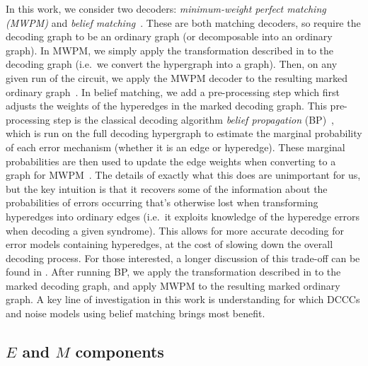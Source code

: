 In this work, we consider two decoders: \textit{minimum-weight perfect matching (MWPM)} and \textit{belief matching}~\cite{higgott2022fragile}.
These are both matching decoders, so require the decoding graph to be an ordinary graph (or decomposable into an ordinary graph).
In MWPM, we simply apply the transformation described in  to the decoding graph (i.e.~we convert the hypergraph into a graph).
Then, on any given run of the circuit, we apply the MWPM decoder to the resulting marked ordinary graph~\cite{higgott2025sparse}.
In belief matching, we add a pre-processing step which first adjusts the weights of the hyperedges in the marked decoding graph.
This pre-processing step is the classical decoding algorithm \textit{belief propagation} (BP)~\cite{McKay,Leifer,PhysRevResearch.2.043423}, which is run on the full decoding hypergraph to estimate the marginal probability of each error mechanism (whether it is an edge or hyperedge).
These marginal probabilities are then used to update the edge weights when converting to a graph for MWPM~\cite{higgott2022fragile}.
The details of exactly what this does are unimportant for us,
but the key intuition is that it recovers some of the information about the probabilities of errors occurring that's otherwise lost when transforming hyperedges into ordinary edges (i.e.~it exploits knowledge of the hyperedge errors when decoding a given syndrome).
This allows for more accurate decoding for error models containing hyperedges,
at the cost of slowing down the overall decoding process.
For those interested, a longer discussion of this trade-off can be found in .
After running BP, we apply the transformation described in  to the marked decoding graph,
and apply MWPM to the resulting marked ordinary graph.
A key line of investigation in this work is understanding for which DCCCs and noise models using belief matching brings most benefit.

\subsection{\texorpdfstring{$E$ and $M$ components}{E and M components}}\label{subsec:E_and_M_components}

